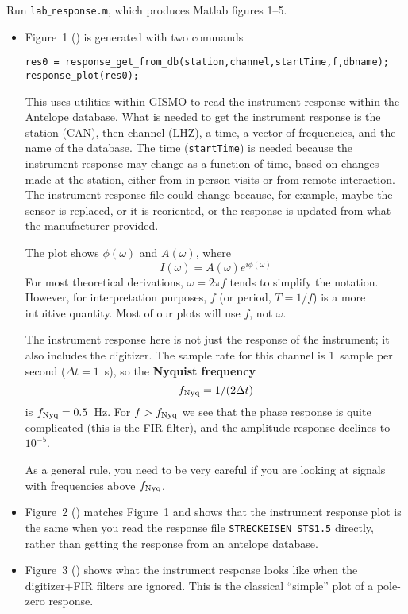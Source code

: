 \documentclass[11pt,titlepage,fleqn]{article}
\newcommand{\tfile}{{\tt lab$\_$response.m}}
\begin{document}
Run \tfile, which produces Matlab figures 1--5.
%
\begin{itemize}
\item Figure~1 () is generated with two commands
%
\begin{verbatim}
res0 = response_get_from_db(station,channel,startTime,f,dbname);
response_plot(res0);
\end{verbatim}
%
This uses utilities within GISMO to read the instrument response within the Antelope database. What is needed to get the instrument response is the station (CAN), then channel (LHZ), a time, a vector of frequencies, and the name of the database. The time (\verb+startTime+) is needed because the instrument response may change as a function of time, based on changes made at the station, either from in-person visits or from remote interaction. The instrument response file could change because, for example, maybe the sensor is replaced, or it is reoriented, or the response is updated from what the manufacturer provided.

The plot shows $\phi(\omega)$ and $A(\omega)$, where
%
\begin{equation}
I(\omega) = A(\omega) e^{i \phi(\omega)}
\end{equation}
%
For most theoretical derivations, $\omega = 2\pi f$ tends to simplify the notation. However, for interpretation purposes, $f$ (or period, $T = 1/f$) is a more intuitive quantity. Most of our plots will use $f$, not $\omega$.

The instrument response here is not just the response of the instrument; it also includes the digitizer. The sample rate for this channel is 1~sample per second ($\Delta t = 1$~s), so the {\bf Nyquist frequency}
%
\begin{equation}
f_{\rm Nyq} = 1/(2\Delta t)
\end{equation}
%
is $f_{\rm Nyq} = 0.5$~Hz. For $f > f_{\rm Nyq}$ we see that the phase response is quite complicated (this is the FIR filter), and the amplitude response declines to $10^{-5}$.

As a general rule, you need to be very careful if you are looking at signals with frequencies above $f_{\rm Nyq}$.

\item Figure~2 () matches Figure~1 and shows that the instrument response plot is the same when you read the response file \verb+STRECKEISEN_STS1.5+ directly, rather than getting the response from an antelope database.

\item Figure~3 () shows what the instrument response looks like when the digitizer+FIR filters are ignored. This is the classical ``simple'' plot of a pole-zero response.


\end{itemize}
\end{document}
